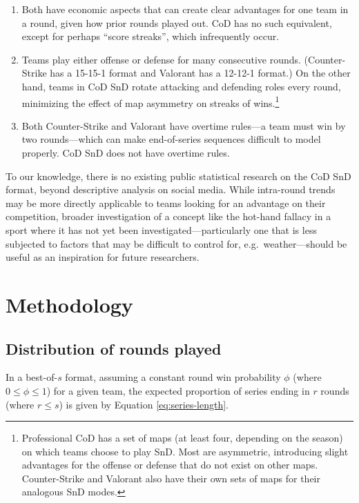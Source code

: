 \documentclass{article}
\providecommand{\tightlist}{%
  \setlength{\itemsep}{0pt}\setlength{\parskip}{0pt}}
\begin{document}
\begin{enumerate}
\def\labelenumi{\arabic{enumi}.}
\tightlist
\item
  Both have economic aspects that can create clear advantages for one
  team in a round, given how prior rounds played out. CoD has no such
  equivalent, except for perhaps ``score streaks'', which infrequently
  occur.
\item
  Teams play either offense or defense for many consecutive rounds.
  (Counter-Strike has a 15-15-1 format and Valorant has a 12-12-1
  format.) On the other hand, teams in CoD SnD rotate attacking and
  defending roles every round, minimizing the effect of map asymmetry on
  streaks of wins.\footnote{Professional CoD has a set of maps (at least
    four, depending on the season) on which teams choose to play SnD.
    Most are asymmetric, introducing slight advantages for the offense
    or defense that do not exist on other maps. Counter-Strike and
    Valorant also have their own sets of maps for their analogous SnD
    modes.}
\item
  Both Counter-Strike and Valorant have overtime rules---a team must win
  by two rounds---which can make end-of-series sequences difficult to
  model properly. CoD SnD does not have overtime rules.
\end{enumerate}

To our knowledge, there is no existing public statistical research on
the CoD SnD format, beyond descriptive analysis on social media. While
intra-round trends may be more directly applicable to teams looking for
an advantage on their competition, broader investigation of a concept
like the hot-hand fallacy in a sport where it has not yet been
investigated---particularly one that is less subjected to factors that
may be difficult to control for, e.g.~weather---should be useful as an
inspiration for future researchers.

\hypertarget{methodology}{%
\section{Methodology}\label{methodology}}

\hypertarget{distribution-of-rounds-played}{%
\subsection{Distribution of rounds
played}\label{distribution-of-rounds-played}}

In a best-of-\(s\) format, assuming a constant round win probability
\(\phi\) (where \(0 \leq \phi \leq 1\)) for a given team, the expected
proportion of series ending in \(r\) rounds (where \(r \leq s\)) is
given by Equation \ref{eq:series-length}.
\end{document}
